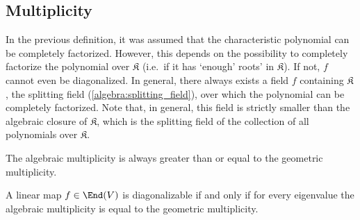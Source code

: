 \subsection{Multiplicity}

    \begin{remark}
        In the previous definition, it was assumed that the characteristic polynomial can be completely factorized. However, this depends on the possibility to completely factorize the polynomial over $\mathfrak{K}$ (i.e.~if it has `enough' roots' in $\mathfrak{K}$). If not, $f$ cannot even be diagonalized. In general, there always exists a field $f$ containing $\mathfrak{K}$, the splitting field (\cref{algebra:splitting_field}), over which the polynomial can be completely factorized. Note that, in general, this field is strictly smaller than the algebraic closure of $\mathfrak{K}$, which is the splitting field of the collection of all polynomials over $\mathfrak{K}$.
    \end{remark}

    \begin{property}
        The algebraic multiplicity is always greater than or equal to the geometric multiplicity.
    \end{property}
    \begin{theorem}\label{linalgebra:diagonalizable_multiplicity}
        A linear map $f\in\End(V)$ is diagonalizable if and only if for every eigenvalue the algebraic multiplicity is equal to the geometric multiplicity.
    \end{theorem}

